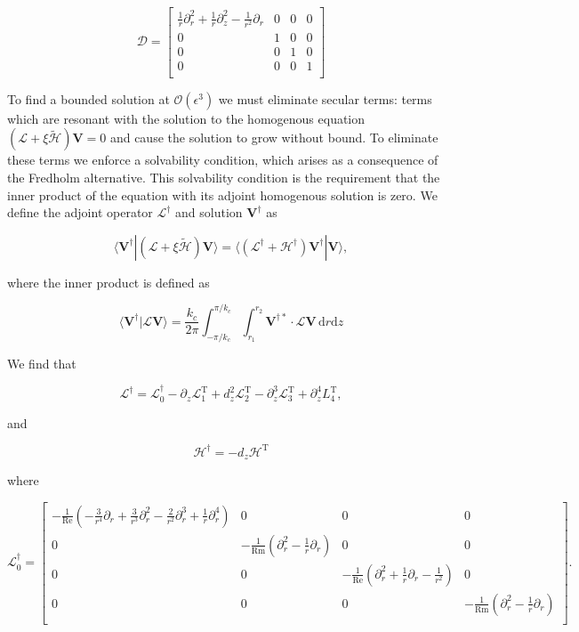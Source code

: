\documentclass{emulateapj}
\newcommand{\beq}{\begin{equation}}
\newcommand{\eeq}{\end{equation}}
\newcommand\reye{\mathrm{Re}}
\newcommand\reym{\mathrm{Rm}}
\begin{document}
\beq
\mathcal{D} = \left[\begin{matrix}
\frac{1}{r}\partial_r^2 + \frac{1}{r}\partial_z^2 - \frac{1}{r^2}\partial_r & 0 & 0 & 0 \\
0 & 1 & 0 & 0 \\
0 & 0 & 1 & 0 \\
0 & 0 & 0 & 1 \\
\end{matrix}\right]
\eeq

To find a bounded solution at $\mathcal{O}(\epsilon^3)$ we must eliminate secular terms: terms which are resonant with the solution to the homogenous equation $(\mathcal{L} + \xi \widetilde{\mathcal{H}}) \mathbf{V} = 0$ and cause the solution to grow without bound. To eliminate these terms we enforce a solvability condition, which arises as a consequence of the Fredholm alternative. This solvability condition is the requirement that the inner product of the equation with its adjoint homogenous solution is zero. We define the adjoint operator $\mathcal{L}^\dagger$ and solution $\mathbf{V}^\dagger$ as 

\beq
\langle \mathbf{V^\dagger} | (\mathcal{L} + \xi \widetilde{\mathcal{H}}) \mathbf{V} \rangle = \langle (\mathcal{L}^\dagger + \mathcal{H}^\dagger) \mathbf{V}^\dagger | \mathbf{V} \rangle,
\eeq

where the inner product is defined as 

\beq\label{eq:inner_product_def}
\langle \mathbf{V^\dagger} | \mathcal{L} \mathbf{V} \rangle = \frac{k_c}{2\pi} \int_{-\pi/k_c}^{\pi/k_c} \int_{r_1}^{r_2} \mathbf{V}^{\dagger*} \cdot \mathcal{L} \mathbf{V} \, \mathrm{d} r \mathrm{d} z
\eeq

We find that 

\beq
\mathcal{L}^\dagger = \mathcal{L}_0^\dagger - \partial_z \mathcal{L}_1^\mathrm{T} + d_z^2 \mathcal{L}_2^\mathrm{T} - \partial_z^3 \mathcal{L}_3^\mathrm{T} + \partial_z^4 L_4^\mathrm{T},
\eeq

and 

\beq
\mathcal{H}^\dagger = - d_z \mathcal{H}^\mathrm{T}
\eeq

where 

\beq
\mathcal{L}_0^\dagger = \left[\begin{matrix}
-\frac{1}{\reye} (-\frac{3}{r^4} \partial_r + \frac{3}{r^3}\partial_r^2 - \frac{2}{r^2}\partial_r^3 + \frac{1}{r}\partial_r^4) & 0 & 0 & 0 \\
0 & -\frac{1}{\reym} (\partial_r^2 - \frac{1}{r} \partial_r) & 0 & 0 \\
0 & 0 &-\frac{1}{\reye} (\partial_r^2 + \frac{1}{r}\partial_r - \frac{1}{r^2}) & 0 \\
0 & 0 & 0 & -\frac{1}{\reym} (\partial_r^2 - \frac{1}{r} \partial_r) \\
\end{matrix}\right].
\eeq
\end{document}
